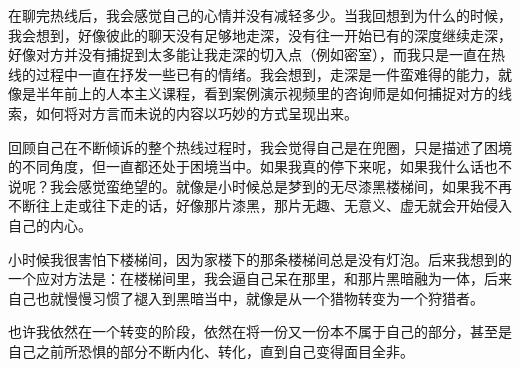 在聊完热线后，我会感觉自己的心情并没有减轻多少。当我回想到为什么的时候，我会想到，好像彼此的聊天没有足够地走深，没有往一开始已有的深度继续走深，好像对方并没有捕捉到太多能让我走深的切入点（例如密室），而我只是一直在热线的过程中一直在抒发一些已有的情绪。我会想到，走深是一件蛮难得的能力，就像是半年前上的人本主义课程，看到案例演示视频里的咨询师是如何捕捉对方的线索，如何将对方言而未说的内容以巧妙的方式呈现出来。

回顾自己在不断倾诉的整个热线过程时，我会觉得自己是在兜圈，只是描述了困境的不同角度，但一直都还处于困境当中。如果我真的停下来呢，如果我什么话也不说呢？我会感觉蛮绝望的。就像是小时候总是梦到的无尽漆黑楼梯间，如果我不再不断往上走或往下走的话，好像那片漆黑，那片无趣、无意义、虚无就会开始侵入自己的内心。

小时候我很害怕下楼梯间，因为家楼下的那条楼梯间总是没有灯泡。后来我想到的一个应对方法是：在楼梯间里，我会逼自己呆在那里，和那片黑暗融为一体，后来自己也就慢慢习惯了褪入到黑暗当中，就像是从一个猎物转变为一个狩猎者。

也许我依然在一个转变的阶段，依然在将一份又一份本不属于自己的部分，甚至是自己之前所恐惧的部分不断内化、转化，直到自己变得面目全非。

